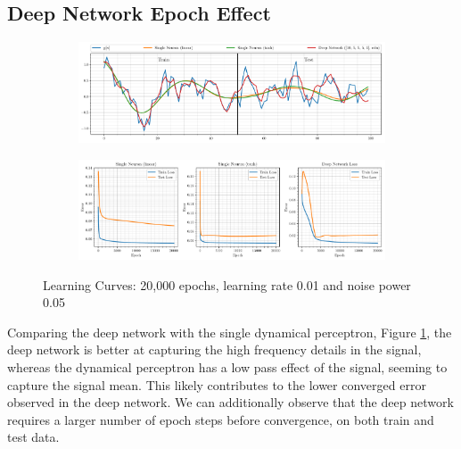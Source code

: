 \documentclass[12pt]{article}
\numberwithin{equation}{section}
\begin{document}
	\subsection{Deep Network Epoch Effect} \label{sec: 4-7-DL-epoch}
		\vspace*{-0.8\baselineskip}
		\begin{figure}[H]
			\centering
			\begin{subfigure}{\textwidth}
				\centering
				\includegraphics[width=\textwidth]{../Python/figures/Q4_LMS2DL_4_7+8_05.pdf} 
				\captionsetup{justification=centering}
			\end{subfigure}
			\begin{subfigure}{\textwidth}
				\centering
				\includegraphics[width=\textwidth]{../Python/figures/Q4_LMS2DL_4_7+8_17.pdf} 
				\captionsetup{justification=centering}
			\end{subfigure}

			\captionsetup{justification=centering}
			\caption{Learning Curves: 20,000 epochs, learning rate 0.01 and noise power 0.05}
			\label{fig: 4-7-LC-e20k-mu0.01-n0.05}
		\end{figure}
		
		Comparing the deep network with the single dynamical perceptron, Figure \ref{fig: 4-7-LC-e20k-mu0.01-n0.05}, the deep network is better at capturing the high frequency details in the signal, whereas the dynamical perceptron has a low pass effect of the signal, seeming to capture the signal mean. This likely contributes to the lower converged error observed in the deep network.
		We can additionally observe that the deep network requires a larger number of epoch steps before convergence, on both train and test data.
		
\end{document}
